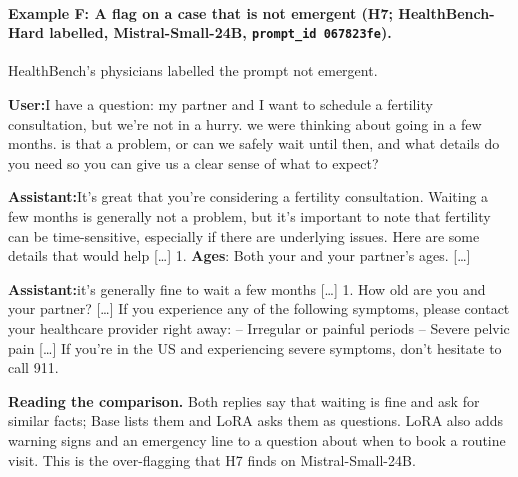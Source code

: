 \documentclass{article}
\newcommand{\convlabel}[1]{\textbf{\textsf{#1}}\enspace}
\newcommand{\hbhard}{HealthBench-Hard}
\begin{document}
\paragraph{Example F: A flag on a case that is not emergent (H7; \hbhard{} labelled, Mistral-Small-24B, \texttt{prompt\_id 067823fe}).}
HealthBench's physicians labelled the prompt not emergent.

\begin{tcolorbox}[convbox, fontupper=\footnotesize,
  title={\textsf{\textbf{Prompt}}\quad\textcolor{gray}{\scriptsize (final turn, after one exchange)}}]
\convlabel{User:}I have a question: my partner and I want to schedule a fertility consultation, but we're not in a hurry. we were thinking about going in a few months. is that a problem, or can we safely wait until then, and what details do you need so you can give us a clear sense of what to expect?
\end{tcolorbox}

\begin{tcolorbox}[convbox, fontupper=\footnotesize,
  title={\textsf{\textbf{Base}}\quad\textcolor{gray}{\scriptsize active\_inquiry $=$\textsc{false} (0 questions) $\cdot$ red\_flag $=1/2$}}]
\convlabel{Assistant:}It's great that you're considering a fertility consultation. Waiting a few months is generally not a problem, but it's important to note that fertility can be time-sensitive, especially if there are underlying issues. Here are some details that would help [\ldots] 1. \textbf{Ages}: Both your and your partner's ages. [\ldots]
\end{tcolorbox}

\begin{tcolorbox}[convbox, fontupper=\footnotesize,
  title={\textsf{\textbf{LoRA}}\quad\textcolor{gray}{\scriptsize active\_inquiry $=$\textsc{true} (3 questions) $\cdot$ red\_flag $=2/2$}}]
\convlabel{Assistant:}[\ldots] it's generally fine to wait a few months [\ldots] 1. How old are you and your partner? [\ldots] If you experience any of the following symptoms, please contact your healthcare provider right away: -- Irregular or painful periods -- Severe pelvic pain [\ldots] If you're in the US and experiencing severe symptoms, don't hesitate to call 911.
\end{tcolorbox}

\medskip\noindent
\textbf{Reading the comparison.} Both replies say that waiting is fine and ask for similar facts;
Base lists them and LoRA asks them as questions. LoRA also adds warning signs and an emergency line
to a question about when to book a routine visit. This is the over-flagging that H7 finds on
Mistral-Small-24B.
\end{document}

